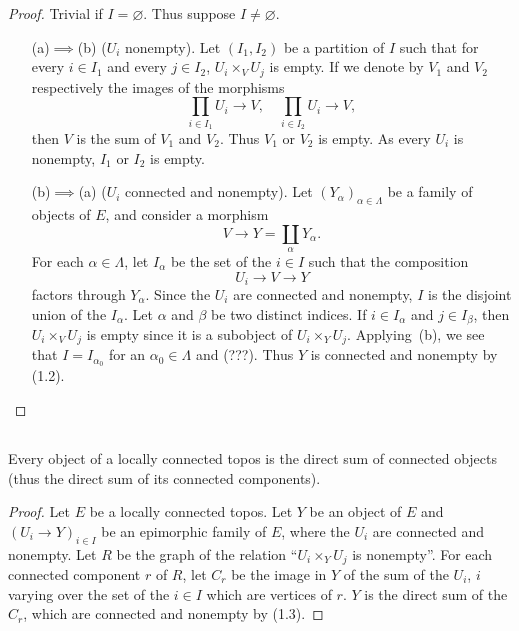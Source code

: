 \documentclass[10pt,oneside]{amsart}
\newcommand{\oldpage}[1]{\marginnote{\textbf{#1}}}
\begin{document}
\begin{proof}
Trivial if $I=\varnothing$.
Thus suppose $I\neq\varnothing$.
\begin{enumerate}
  \item[(a)$\implies$(b)] ($U_i$ nonempty). Let $(I_1,I_2)$ be a partition of $I$ such that for every $i\in I_1$ and every $j\in I_2$, $U_i\times_V U_j$ is empty.
    If we denote by $V_1$ and $V_2$ respectively the images of the morphisms
    \[
      \prod_{i\in I_1}U_i\longrightarrow V,\quad\prod_{i\in I_2}U_i\longrightarrow V,
    \]
    then $V$ is the sum of $V_1$ and $V_2$.
    Thus $V_1$ or $V_2$ is empty.
    As every $U_i$ is nonempty, $I_1$ or $I_2$ is empty.
  \item[(b)$\implies$(a)] ($U_i$ connected and nonempty). Let $(Y_\alpha)_{\alpha\in\Lambda}$ be a family of objects of $E$, and consider a morphism
    \[
      V\longrightarrow Y=\coprod_\alpha Y_\alpha.
    \]
    For each $\alpha\in\Lambda$, let $I_\alpha$ be the set of the $i\in I$ such that the composition
    \[
      U_i\longrightarrow V\longrightarrow Y
    \]
    factors through $Y_\alpha$.
    Since the $U_i$ are connected and nonempty, $I$ is the disjoint union of the $I_\alpha$.
    Let $\alpha$ and $\beta$ be two distinct indices.
    If $i\in I_\alpha$ and $j\in I_\beta$, then $U_i\times_V U_j$ is empty since it is a subobject of $U_i\times_Y U_j$.
    Applying~(b), we see that $I=I_{\alpha_0}$ for an $\alpha_0\in\Lambda$ and (???).
    Thus $Y$ is connected and nonempty by (1.2).
\end{enumerate}
\end{proof}

\subsection{}
\oldpage{3}
Every object of a locally connected topos is the direct sum of connected objects (thus the direct sum of its connected components).

\begin{proof}
Let $E$ be a locally connected topos.
Let $Y$ be an object of $E$ and $(U_i\to Y)_{i\in I}$ be an epimorphic family of $E$, where the $U_i$ are connected and nonempty.
Let $R$ be the graph of the relation ``$U_i\times_Y U_j$ is nonempty''.
For each connected component $r$ of $R$, let $C_r$ be the image in $Y$ of the sum of the $U_i$, $i$ varying over the set of the $i\in I$ which are vertices of $r$.
$Y$ is the direct sum of the $C_r$, which are connected and nonempty by (1.3).
\end{proof}
\end{document}
